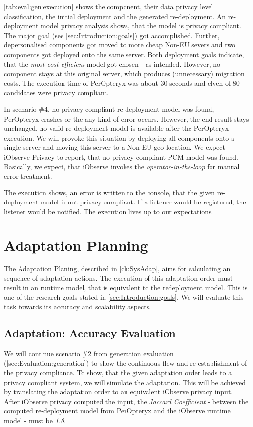 \autoref{tab:eval:gen:execution} shows the component, their data privacy level classification, the initial deployment and the generated re-deployment. An re-deployment model privacy analysis shows, that the model is privacy compliant. The major goal (see \autoref{sec:Introduction:goals}) got accomplished. Further, depersonalised components got moved to more cheap Non-EU severs and two components got deployed onto the same server. Both deployment goals indicate, that the \textit{most cost efficient} model got chosen - as intended. However, no component stays at this original server, which produces (unnecessary) migration costs. The execution time of PerOpteryx was about 30 seconds and elven of 80 candidates were privacy compliant.

In scenario \#4, no privacy compliant re-deployment model was found, PerOpteryx crashes or the any kind of error occurs. However, the end result stays unchanged, no valid re-deployment model is available after the PerOpteryx execution. We will provoke this situation by deploying all components onto a single server and moving this server to a Non-EU geo-location. We expect iObserve Privacy to report, that no privacy compliant PCM model was found. Basically, we expect, that iObserve invokes the \textit{operator-in-the-loop} for manual error treatment.

The execution shows, an error is written to the console, that the given re-deployment model is not privacy compliant. If a listener would be registered, the listener would be notified. The execution lives up to our expectations. 

\section{Adaptation Planning}
\label{sec:Evaluation:planning}

The Adaptation Planing, described in \autoref{ch:SysAdap}, aims for calculating an sequence of adaptation actions. The execution of this adaptation order must result in an runtime model, that is equivalent to the redeployment model. This is one of the research goals stated in \autoref{sec:Introduction:goals}. We will evaluate this task towards its accuracy and scalability aspects.

 
\subsection{Adaptation: Accuracy Evaluation}

We will continue scenario \#2 from generation evaluation (\autoref{sec:Evaluation:generation}) to show the continuous flow and re-establishment of the privacy compliance. To show, that the given adaptation order leads to a privacy compliant system, we will simulate the adaptation. This will be achieved by translating the adaptation order to an equivalent iObserve privacy input. After iObserve privacy computed the input, the \textit{Jaccard Coefficient} - between the computed re-deployment model from PerOpteryx and the iObserve runtime model - must be \textit{1.0}.

